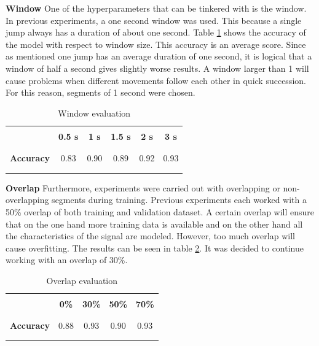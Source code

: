 \documentclass[twocolumn]{phdsymp} %
\begin{document}
\noindent\textbf{Window}\newline
One of the hyperparameters that can be tinkered with is the window. In previous experiments, a one second window was used. This because a single jump always has a duration of about one second. Table \ref{tab:window} shows the accuracy of the model with respect to window size. This accuracy is an average score. Since as mentioned one jump has an average duration of one second, it is logical that a window of half a second gives slightly worse results. A window larger than 1 will cause problems when different movements follow each other in quick succession. For this reason, segments of 1 second were chosen. \\

\begin{table}[!htpd]
  \centering 
  \caption{Window evaluation}
  \label{tab:window}
\begin{tabular}{lccccc}
 \hline \\
\textbf{}         & \textbf{0.5 s} & \textbf{1 s} & \textbf{1.5 s} & \textbf{2 s} & \textbf{3 s} \\\\
 \hline \\
\textbf{Accuracy} & 0.83           & 0.90         & 0.89           & 0.92         & 0.93  \\\\
 \hline \\
\end{tabular}
\end{table}

\noindent\textbf{Overlap}\newline
Furthermore, experiments were carried out with overlapping or non-overlapping segments during training. Previous experiments each worked with a 50\% overlap of both training and validation dataset. A certain overlap will ensure that on the one hand more training data is available and on the other hand all the characteristics of the signal are modeled. However, too much overlap will cause overfitting. The results can be seen in table \ref{tab:overlap}. It was decided to continue working with an overlap of 30\%. \\

\begin{table}[!htpd]
  \centering
  \caption{Overlap evaluation}
  \label{tab:overlap}
\begin{tabular}{lcccc}
 \hline \\
\textbf{}         & \textbf{0\%} & \textbf{30\%} & \textbf{50\%} & \textbf{70\%} \\\\
 \hline \\
\textbf{Accuracy} & 0.88         & 0.93          & 0.90          & 0.93   \\\\
 \hline \\
\end{tabular}
\end{table}
\end{document}
